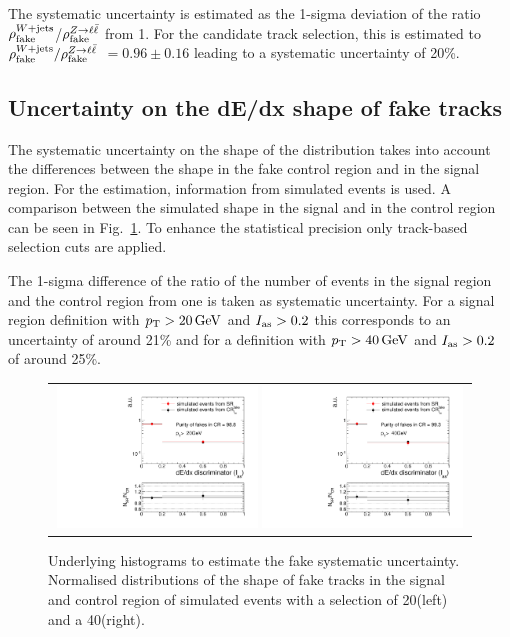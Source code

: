 The systematic uncertainty is estimated as the 1-sigma deviation of the ratio $\rho_{\text{fake}}^{W+\text{jets}}$/$\rho_{\text{fake}}^{Z\rightarrow\ell\bar{\ell}}$ from 1.
For the candidate track selection, this is estimated to $\rho_{\text{fake}}^{W+\text{jets}}/\rho_{\text{fake}}^{Z\rightarrow\ell\bar{\ell}}$ $ =  0.96 \pm 0.16 $ leading to a systematic uncertainty of 20\%.
\subsection{Uncertainty on the dE/dx shape of fake tracks}
\label{sec:FakeIasUncertainty}
The systematic uncertainty on the shape of the \ias distribution takes into account the differences between the \ias shape in the fake control region \fakeCR and in the signal region.
For the estimation, information from simulated \WJets events is used.
A comparison between the simulated \ias shape in the signal and in the control region can be seen in Fig.~\ref{fig:FakeIasUnc}.
To enhance the statistical precision only track-based selection cuts are applied.

The 1-sigma difference of the ratio of the number of events in the signal region and the control region from one is taken as systematic uncertainty.
For a signal region definition with $p_{\text{T}}>20\,\text{Ge}\kern-0.06667em\text{V}$ and $I_{\text{as}}>0.2$ this corresponds to an uncertainty of around 21\% and for a definition with $p_{\text{T}}>40\,\text{Ge}\kern-0.06667em\text{V}$ and $I_{\text{as}}>0.2$ of around 25\%.
\begin{figure}[!h]
  \centering 
  \begin{tabular}{c}
    \includegraphics[width=0.49\textwidth]{figures/analysis/Background/hASmi_SRbinning_fakes_ECalaoLe5_trackPtGt20_MC_CR_MC_SR.pdf}
    \includegraphics[width=0.49\textwidth]{figures/analysis/Background/hASmi_SRbinning_fakes_ECalaoLe5_trackPtGt40_MC_CR_MC_SR.pdf}
  \end{tabular}
  \caption{Underlying histograms to estimate the fake \ias systematic uncertainty. 
           Normalised distributions of the \ias shape of fake tracks in the signal and control region of simulated \WJets events with a \pt selection of 20\gev (left) and a 40\gev (right).}
  \label{fig:FakeIasUnc}
\end{figure}

